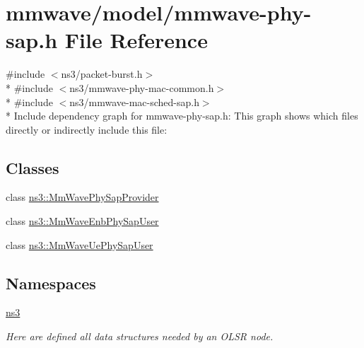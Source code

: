 \hypertarget{mmwave-phy-sap_8h}{}\section{mmwave/model/mmwave-\/phy-\/sap.h File Reference}
\label{mmwave-phy-sap_8h}
{\ttfamily \#include $<$ns3/packet-\/burst.\+h$>$}\\*
{\ttfamily \#include $<$ns3/mmwave-\/phy-\/mac-\/common.\+h$>$}\\*
{\ttfamily \#include $<$ns3/mmwave-\/mac-\/sched-\/sap.\+h$>$}\\*
Include dependency graph for mmwave-\/phy-\/sap.h\+:
This graph shows which files directly or indirectly include this file\+:
\subsection*{Classes}
\begin{DoxyCompactItemize}
\item 
class \hyperlink{classns3_1_1MmWavePhySapProvider}{ns3\+::\+Mm\+Wave\+Phy\+Sap\+Provider}
\item 
class \hyperlink{classns3_1_1MmWaveEnbPhySapUser}{ns3\+::\+Mm\+Wave\+Enb\+Phy\+Sap\+User}
\item 
class \hyperlink{classns3_1_1MmWaveUePhySapUser}{ns3\+::\+Mm\+Wave\+Ue\+Phy\+Sap\+User}
\end{DoxyCompactItemize}
\subsection*{Namespaces}
\begin{DoxyCompactItemize}
\item 
 \hyperlink{namespacens3}{ns3}
\begin{DoxyCompactList}\small\item\em Here are defined all data structures needed by an O\+L\+SR node. \end{DoxyCompactList}\end{DoxyCompactItemize}
